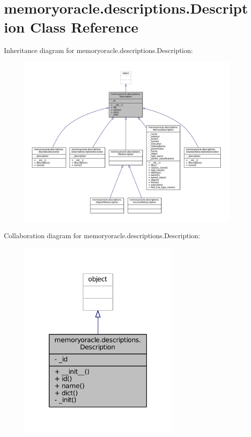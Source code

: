 \hypertarget{classmemoryoracle_1_1descriptions_1_1Description}{}\section{memoryoracle.\+descriptions.\+Description Class Reference}
\label{classmemoryoracle_1_1descriptions_1_1Description}


Inheritance diagram for memoryoracle.\+descriptions.\+Description\+:
\nopagebreak
\begin{figure}[H]
\begin{center}
\leavevmode
\includegraphics[width=350pt]{classmemoryoracle_1_1descriptions_1_1Description__inherit__graph}
\end{center}
\end{figure}


Collaboration diagram for memoryoracle.\+descriptions.\+Description\+:\nopagebreak
\begin{figure}[H]
\begin{center}
\leavevmode
\includegraphics[width=230pt]{classmemoryoracle_1_1descriptions_1_1Description__coll__graph}
\end{center}
\end{figure}
